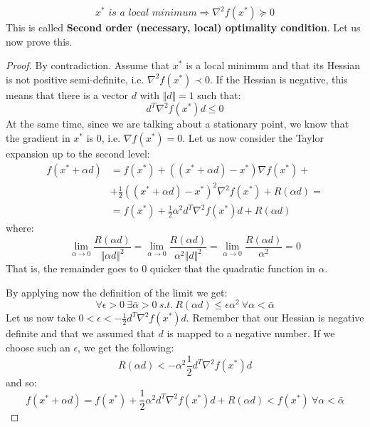 \begin{equation}
    x^* \textit{ is a local minimum} \Rightarrow \nabla^2 f(x^*) \succeq 0
\end{equation}
This is called \textbf{Second order (necessary, local) optimality condition}. Let us now prove this.
\begin{proof}
By contradiction. Assume that $x^*$ is a local minimum and that its Hessian is not positive semi-definite, i.e. $\nabla^2 f(x^*) \prec 0$. If the Hessian is negative, this means that there is a vector $d$ with $\Vert d \Vert = 1$ such that:
\begin{equation}
    d^T \nabla^2 f(x^*) d \leq 0
\end{equation}
At the same time, since we are talking about a stationary point, we know that the gradient in $x^*$ is 0, i.e. $\nabla f(x^*) = 0$. Let us now consider the Taylor expansion up to the second level:
\begin{equation}
\begin{split}
    f(x^* + \alpha d) &= f(x^*) + ((x^* + \alpha d) - x^*) \nabla f(x^*) +\\
    &+ \frac{1}{2}((x^* + \alpha d) - x^*)^2 \nabla^2 f(x^*) + R(\alpha d) =\\
    &= f(x^*) + \frac{1}{2}\alpha^2 d^T \nabla^2 f(x^*) d + R(\alpha d)
\end{split}
\end{equation}
where:
\begin{equation}
    \lim_{\alpha \rightarrow 0} \frac{R(\alpha d)}{\Vert \alpha d \Vert^2} = \lim_{\alpha \rightarrow 0} \frac{R(\alpha d)}{\alpha^2 \Vert d \Vert^2} = \lim_{\alpha \rightarrow 0} \frac{R(\alpha d)}{\alpha^2} = 0
\end{equation}
That is, the remainder goes to 0 quicker that the quadratic function in $\alpha$.
\par By applying now the definition of the limit we get:
\begin{equation}
    \forall \epsilon > 0\ \exists \bar{\alpha} > 0\ s.t.\ R(\alpha d) \leq \epsilon \alpha^2\ \forall \alpha < \bar{\alpha}
\end{equation}
Let us now take $0 < \epsilon < - \frac{1}{2} d^T \nabla^2 f(x^*) d$. Remember that our Hessian is negative definite and that we assumed that $d$ is mapped to a negative number. If we choose such an $\epsilon$, we get the following:
\begin{equation}
    R(\alpha d) < - \alpha^2 \frac{1}{2} d^T \nabla^2 f(x^*) d
\end{equation}
and so:
\begin{equation}
    f(x^* + \alpha d) = f(x^*) + \frac{1}{2} \alpha^2 d^T \nabla^2 f(x^*) d + R(\alpha d) < f(x^*)\ \forall \alpha < \bar{\alpha}
\end{equation}
\end{proof}
